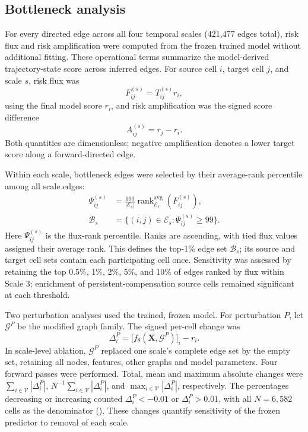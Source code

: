\subsection*{Bottleneck analysis}

For every directed edge across all four temporal scales (421,477 edges total), risk flux and risk amplification were computed from the frozen trained model without additional fitting. These operational terms summarize the model-derived trajectory-state score across inferred edges. For source cell \(i\), target cell \(j\), and scale \(s\), risk flux was
\begin{equation}\label{eq:flux}
F_{ij}^{(s)}=T_{ij}^{(s)}r_i,
\end{equation}
using the final model score \(r_i\), and risk amplification was the signed score difference
\begin{equation}\label{eq:amplification}
A_{ij}^{(s)}=r_j-r_i.
\end{equation}
Both quantities are dimensionless; negative amplification denotes a lower target score along a forward-directed edge.

Within each scale, bottleneck edges were selected by their average-rank percentile among all scale edges:
\begin{equation}\label{eq:bottleneck}
\begin{aligned}
\Psi_{ij}^{(s)}&=\frac{100}{|\mathcal E_s|}
\operatorname{rank}_{\mathcal E_s}^{\mathrm{avg}}(F_{ij}^{(s)}),\\
\mathcal B_s&=\{(i,j)\in\mathcal E_s:\Psi_{ij}^{(s)}\geq99\}.
\end{aligned}
\end{equation}
Here \(\Psi_{ij}^{(s)}\) is the flux-rank percentile. Ranks are ascending, with tied flux values assigned their average rank. This defines the top-1\% edge set \(\mathcal B_s\); its source and target cell sets contain each participating cell once. Sensitivity was assessed by retaining the top 0.5\%, 1\%, 2\%, 5\%, and 10\% of edges ranked by flux within Scale 3; enrichment of persistent-compensation source cells remained significant at each threshold.

Two perturbation analyses used the trained, frozen model. For perturbation \(P\), let \(\mathcal G^{P}\) be the modified graph family. The signed per-cell change was
\begin{equation}\label{eq:perturbation}
\Delta_i^{P}=\big[f_{\theta}(\mathbf X,\mathcal G^{P})\big]_i-r_i.
\end{equation}
In scale-level ablation, \(\mathcal G^{P}\) replaced one scale's complete edge set by the empty set, retaining all nodes, features, other graphs and model parameters. Four forward passes were performed. Total, mean and maximum absolute changes were \(\sum_{i\in\mathcal V}|\Delta_i^{P}|\), \(N^{-1}\sum_{i\in\mathcal V}|\Delta_i^{P}|\), and \(\max_{i\in\mathcal V}|\Delta_i^{P}|\), respectively. The percentages decreasing or increasing counted \(\Delta_i^{P}<-0.01\) or \(\Delta_i^{P}>0.01\), with all \(N=6{,}582\) cells as the denominator (). These changes quantify sensitivity of the frozen predictor to removal of each scale.

